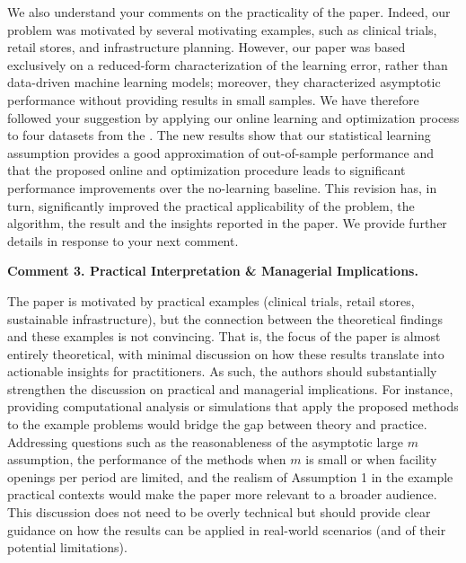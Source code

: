 \documentclass[11pt]{article}
\begin{document}
We also understand your comments on the practicality of the paper. Indeed, our problem was motivated by several motivating examples, such as clinical trials, retail stores, and infrastructure planning. However, our paper was based exclusively on a reduced-form characterization of the learning error, rather than data-driven machine learning models; moreover, they characterized asymptotic performance without providing results in small samples. We have therefore followed your suggestion by applying our online learning and optimization process to four datasets from the \cite{UCI}. The new results show that our statistical learning assumption provides a good approximation of out-of-sample performance and that the proposed online and optimization procedure leads to significant performance improvements over the no-learning baseline. This revision has, in turn, significantly improved the practical applicability of the problem, the algorithm, the result and the insights reported in the paper. We provide further details in response to your next comment.

\begin{commentBox}
    \textbf{Comment 3. Practical Interpretation \& Managerial Implications.}\label{R3:3}

    The paper is motivated by practical examples (clinical trials, retail stores, sustainable infrastructure), but the connection between the theoretical findings and these examples is not convincing. That is, the focus of the paper is almost entirely theoretical, with minimal discussion on how these results translate into actionable insights for practitioners. As such, the authors should substantially strengthen the discussion on practical and managerial implications. For instance, providing computational analysis or simulations that apply the proposed methods to the example problems would bridge the gap between theory and practice. Addressing questions such as the reasonableness of the asymptotic large $m$ assumption, the performance of the methods when $m$ is small or when facility openings per period are limited, and the realism of Assumption 1 in the example practical contexts would make the paper more relevant to a broader audience. This discussion does not need to be overly technical but should provide clear guidance on how the results can be applied in real-world scenarios (and of their potential limitations).
\end{commentBox}
\end{document}
